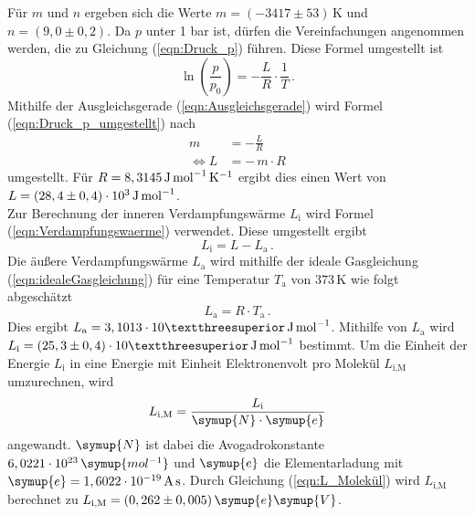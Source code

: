     Für $m$ und $n$ ergeben sich die Werte $m = (-3417 \pm 53) \, \unit{\kelvin}$
    und $n = (9,0 \pm 0,2)$.
    Da $p$ unter 1 bar ist, dürfen die Vereinfachungen angenommen werden, die zu Gleichung (\ref{eqn:Druck_p}) führen. Diese Formel umgestellt ist 
    \begin{equation}
      \label{eqn:Druck_p_umgestellt}
      \ln{\left(\frac{p}{p_0}\right)} = - \frac{L}{R} \cdot \frac{1}{T} \, . 
    \end{equation}
    Mithilfe der Ausgleichsgerade (\ref{eqn:Ausgleichsgerade}) wird Formel 
    (\ref{eqn:Druck_p_umgestellt}) nach 
    \begin{align}
      m &= - \frac{L}{R} \\
      \Leftrightarrow L &= - \, m \cdot R
    \end{align}
    umgestellt. Für $R = 8,3145 \, \unit[per-mode=reciprocal]{\joule\per\mol\per\kelvin}$ \cite{R_Konstante} ergibt dies einen Wert von $L = (28,4 \pm 0,4) \cdot 10^3 \, \unit[per-mode=reciprocal]{\joule\per\mol}$.
    \\
    Zur Berechnung der inneren Verdampfungswärme $L_{\text{i}}$ wird Formel (\ref{eqn:Verdampfungswaerme}) verwendet. Diese umgestellt ergibt 
    \begin{equation}
      L_{\text{i}} = L - L_{\text{a}} \, . 
    \end{equation}
    Die äußere Verdampfungswärme $L_{\text{a}}$ wird mithilfe der ideale Gasgleichung (\ref{eqn:idealeGasgleichung}) für eine Temperatur $T_{\text{a}}$ von $373 \, \unit{\kelvin}$ wie folgt abgeschätzt
    \begin{equation}
      L_{\text{a}} = R \cdot  T_{\text{a}}\, . 
    \end{equation}
    Dies ergibt $L_{\text{a}} = 3,1013 \cdot 10³ \, \unit[per-mode=reciprocal]{\joule\per\mol}$. 
    Mithilfe von $L_{\text{a}}$ wird $L_{\text{i}} = (25,3 \pm 0,4) \cdot 10³ \, \unit[per-mode=reciprocal]{\joule\per\mol}$ bestimmt. 
    Um die Einheit der Energie $L_{\text{i}}$ in eine Energie mit Einheit Elektronenvolt pro Molekül $L_{\text{i,M}}$ umzurechnen, wird 
    \begin{equation}
      L_{\text{i,M}} = \frac{L_{\text{i}}}{\symup{N} \cdot \symup{e}}
      \label{eqn:L_Molekül}
    \end{equation}
    angewandt. $\symup{N}$ ist dabei die Avogadrokonstante $6,0221 \cdot 10^{23} \, \symup{mol^{-1}}$ und $\symup{e}$ die Elementarladung mit 
    $\symup{e} = 1,6022 \cdot 10^{-19} \, \unit{\ampere\second}$. 
    Durch Gleichung (\ref{eqn:L_Molekül}) wird $L_{\text{i,M}}$ berechnet zu $L_{\text{i,M}} = (0,262 \pm 0,005) \, \symup{e}\symup{V}$.
    
